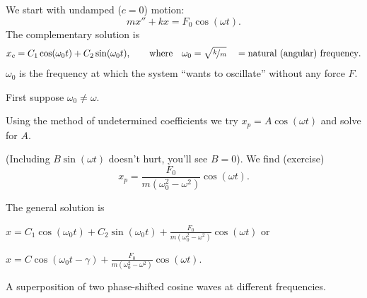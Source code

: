 \documentclass[10pt,aspectratio=169]{beamer}
\begin{document}
\begin{frame}
We start with undamped ($c=0$) motion:
\[
mx'' + kx = F_0 \cos (\omega t) .
\]
\pause
The complementary solution is
\[
x_c = C_1 \cos (\omega_0 t) + C_2 \sin (\omega_0 t) ,
\qquad
\text{where}
\quad
\omega_0 = \sqrt{\nicefrac{k}{m}} 
\quad = \text{natural (angular) frequency}.
\]
\pause
$\omega_0$ is the frequency
at which the system ``wants to oscillate'' without any force $F$.

\medskip
\pause

First suppose \quad $\omega_0 \neq \omega$.

\medskip
\pause

Using the method of undetermined coefficients we try
\quad
$x_p = A \cos (\omega t)$
\quad and solve for $A$.

\medskip
\pause

(Including $B\sin(\omega t)$ doesn't hurt, you'll see $B=0$).
\pause
We find (exercise)
\[
x_p = \frac{F_0}{m(\omega_0^2 - \omega^2)} \cos (\omega t) .
\]
\pause
\vspace*{-0.2in}

The general solution is

\medskip

\quad $\displaystyle x = C_1 \cos (\omega_0 t) + C_2 \sin (\omega_0 t) +
\frac{F_0}{m(\omega_0^2 - \omega^2)} \cos (\omega t)$
\quad \pause or

\vspace*{-0.05in}

\hspace*{3in}$\displaystyle x = C \cos (\omega_0 t - \gamma) +
\frac{F_0}{m(\omega_0^2 - \omega^2)} \cos (\omega t)$.

\medskip

A superposition of two phase-shifted cosine waves at different frequencies.
\end{frame}
\end{document}

